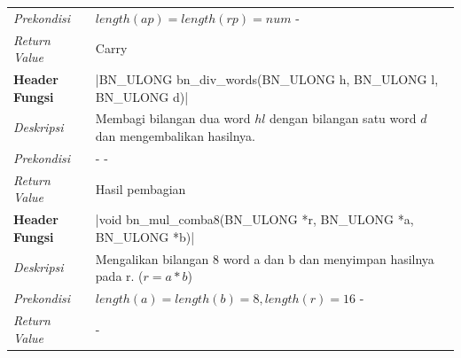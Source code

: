\begin{table}[h]
\begin{tabular}{R{2.8cm}L{10.5cm}}
          \textit{Prekondisi}    & $length(ap) = length(rp) = num$ -                                                                                  \\
          \textit{Return Value}  & Carry
          \\ \bottomrule
          \textbf{Header Fungsi} & |BN_ULONG bn_div_words(BN_ULONG h, BN_ULONG l, BN_ULONG d)|                        \\ \midrule
          \textit{Deskripsi}  & Membagi bilangan dua word $hl$ dengan bilangan satu word $d$ dan mengembalikan hasilnya.                                                                                   \\
          \textit{Prekondisi}    & - -                                                                                  \\
          \textit{Return Value}  & Hasil pembagian
          \\ \bottomrule
          \textbf{Header Fungsi} & |void bn_mul_comba8(BN_ULONG *r, BN_ULONG *a, BN_ULONG *b)|                        \\ \midrule
          \textit{Deskripsi} &  Mengalikan bilangan 8 word a dan b dan menyimpan hasilnya pada r. ($r = a*b$)                                                                                    \\
          \textit{Prekondisi}    & $length(a) = length(b) = 8, length(r) = 16$ -                                                                                  \\
          \textit{Return Value}  & -
          \\ \bottomrule
        \end{tabular}
      \end{table}
